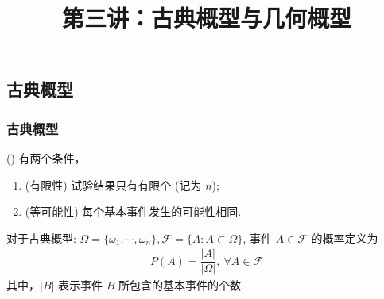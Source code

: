 



		\title[概率论]{第三讲：古典概型与几何概型}
	\date{}


	{ 
		\begin{frame}
			\titlepage
		\end{frame}
	}

\subsection{古典概型}
	\begin{frame}
		\frametitle{古典概型}
		\begin{defi}() 有两个条件，
			\begin{enumerate}[<+-|alert@+>][(1)]
				\item  (有限性) 试验结果只有有限个 (记为 $n$);
				\item (等可能性) 每个基本事件发生的可能性相同.
			\end{enumerate}

		\end{defi}

		\pause 对于古典概型: $\Omega=\{\omega_1,\cdots,\omega_n\}, \mathcal{F}=\{A:A\subset \Omega\}$, 事件 $A\in\mathcal{F}$ 的概率定义为
		\begin{eqnarray*}
			P(A)=\dfrac{|A|}{|\Omega|}, \ \forall A\in \mathcal{F}
		\end{eqnarray*}
		其中，$|B|$ 表示事件 $B$ 所包含的基本事件的个数.

	\end{frame}

